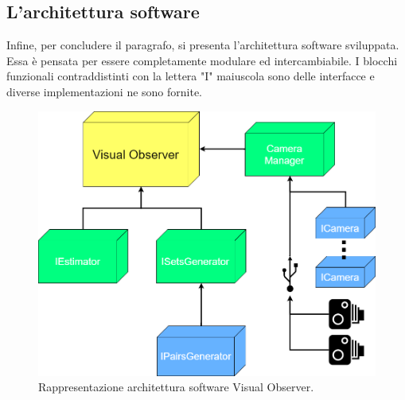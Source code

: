 \subsection{L'architettura software}
\label{sec:dev:arch}
Infine, per concludere il paragrafo, si presenta l'architettura software sviluppata. Essa è pensata per essere completamente modulare ed intercambiabile. I blocchi funzionali contraddistinti con la lettera "I" maiuscola sono delle interfacce e diverse implementazioni ne sono fornite.
\begin{figure}[h!]
	\centering
	\includegraphics[width=400pt]{imgs/arch.png}
	\caption{Rappresentazione architettura software Visual Observer.}
	\label{vis:impl:arch}
\end{figure} 

